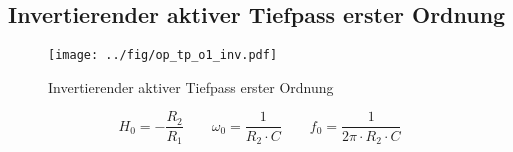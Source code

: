 



\subsection{Invertierender aktiver Tiefpass erster Ordnung}
\label{filt:o1-tp}
\begin{figure}[h!]
	\centering
	\texttt{[image: ../fig/op\_tp\_o1\_inv.pdf]}
	\caption{Invertierender aktiver Tiefpass erster Ordnung}
	\label{sch:op-tp-o1-inv}
\end{figure}
\[ H_0 = - \frac{R_2}{R_1} \qquad
\omega_0 = \frac{1}{R_2 \cdot C} \qquad
f_0 = \frac{1}{2 \pi \cdot R_2 \cdot C} \]